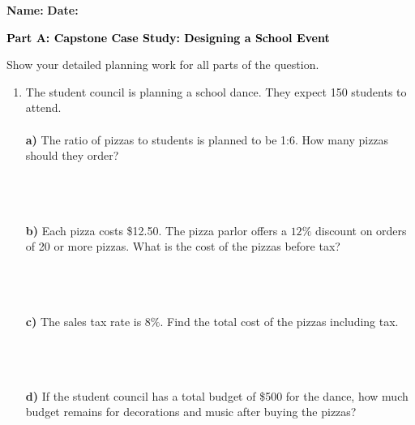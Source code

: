 \documentclass[12pt, letterpaper, fleqn]{article}
\begin{document}
\textbf{Name:} \underline{\hspace{5cm}}
\hfill
\textbf{Date:} \underline{\hspace{3cm}}\\

\begin{tcolorbox}[colback=black!10]
    \large\textcolor{black}{\textbf{Part A: Capstone Case Study: Designing a School Event}}
\end{tcolorbox}

\vspace{3mm}

\noindent
Show your detailed planning work for all parts of the question.

\vspace{5mm}

\begin{enumerate}[itemsep=2.2cm, leftmargin=0.6cm]
\item The student council is planning a school dance. They expect 150 students to attend. \\ \\
\textbf{a)} The ratio of pizzas to students is planned to be 1:6. How many pizzas should they order? \\ \\
 \\ \\
\vspace{1cm}

\textbf{b)} Each pizza costs \$12.50. The pizza parlor offers a $12\%$ discount on orders of 20 or more pizzas. What is the cost of the pizzas before tax? \\ \\
 \\ \\
\vspace{1cm}

\textbf{c)} The sales tax rate is $8\%$. Find the total cost of the pizzas including tax. \\ \\
 \\ \\
\vspace{1cm}

\textbf{d)} If the student council has a total budget of \$500 for the dance, how much budget remains for decorations and music after buying the pizzas? \\ \\
 \\
\end{enumerate}
\end{document}

